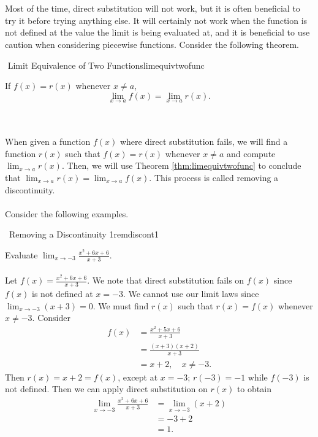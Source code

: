         \vphantom
        \\
        \\
        Most of the time, direct substitution will not work, but it is often beneficial to try it before trying anything else. It will certainly not work when the function is not defined at the value the limit is being evaluated at, and it is beneficial to use caution when considering piecewise functions. Consider the following theorem.
        \begin{theorem}{\Stop\,\,Limit Equivalence of Two Functions}{limequivtwofunc}
            
            If \(f(x)=r(x)\) whenever \(x\neq a\),
            \begin{equation*}
                \lim_{x\to a}f(x)=\lim_{x\to a }r(x).
            \end{equation*}

        \end{theorem}
        \vphantom
        \\
        \\
        When given a function \(f(x)\) where direct substitution fails, we will find a function \(r(x)\) such that \(f(x)=r(x)\) whenever \(x\neq a\) and compute \(\lim_{x\to a}r(x)\). Then, we will use Theorem \ref{thm:limequivtwofunc} to conclude that \(\lim_{x\to a}r(x)=\lim_{x\to a}f(x)\). This process is called removing a discontinuity.
        \pagebreak
        \\
        \\
        Consider the following examples.
        \begin{example}{\Difficulty\,\Difficulty\,\,Removing a Discontinuity 1}{remdiscont1}

            Evaluate \(\lim_{x\to -3}\frac{x^2+6x+6}{x+3}\). 
            \\
            \\
            Let \(f(x)=\frac{x^2+6x+6}{x+3}\). We note that direct substitution fails on \(f(x)\) since \(f(x)\) is not defined at \(x=-3\). We cannot use our limit laws since \(\lim_{x\to -3}(x+3)=0\). We must find \(r(x)\) such that \(r(x)=f(x)\) whenever \(x\neq -3\). Consider
            \begin{align*}
                f(x)&=\frac{x^2+5x+6}{x+3} \\
                &=\frac{(x+3)(x+2)}{x+3} \\
                &=x+2,\quad {x\neq -3}.
            \end{align*}
            Then \(r(x)=x+2=f(x)\), except at \(x=-3\); \(r(-3)=-1\) while \(f(-3)\) is not defined. Then we can apply direct substitution on \(r(x)\) to obtain
            \begin{align*}
                \lim_{x\to -3}\frac{x^2+6x+6}{x+3}&=\lim_{x\to -3}(x+2) \\
                &=-3+2 \\
                &=1.
            \end{align*}
        
        \end{example}
